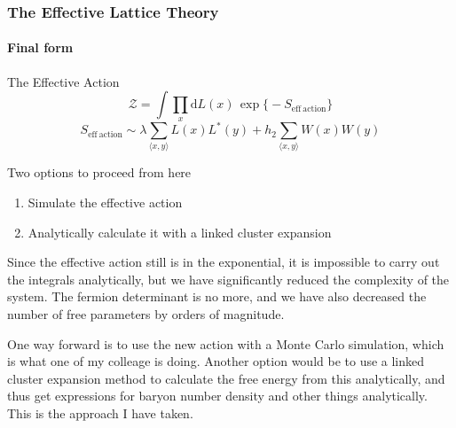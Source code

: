 \documentclass[12pt,a4paper,dvipsnames,usenames]{beamer}
\begin{document}
\begin{frame}
  \frametitle{The Effective Lattice Theory}
  \framesubtitle{Final form}

  \begin{alertblock}{The Effective Action} \vspace{5pt}
    \[
      \mathcal{Z} = \int \prod_x \mathrm{d} L(x) \, \exp \big\{ \minus S_{\mathrm{eff \: action}} \big\}
    \]
    \[
      S_{\mathrm{eff \: action}} \sim \lambda \sum_{\langle x, y \rangle} L(x) L^*(y) + h_2\sum_{\langle x, y \rangle} W(x) W(y)
    \]
  \end{alertblock}

  \vspace{1em}

  Two options to proceed from here

  \begin{enumerate}
    \item Simulate the effective action
    \item {}Analytically calculate it with a linked cluster expansion
  \end{enumerate}

  {
    Since the effective action still is in the exponential, it is impossible to carry out the integrals analytically, but we have
    significantly reduced the complexity of the system. The fermion determinant is no more, and we have also decreased the number
    of free parameters by orders of magnitude.

    One way forward is to use the new action with a Monte Carlo simulation, which is what one of my colleage is doing. Another
    option would be to use a linked cluster expansion method to calculate the free energy from this analytically, and thus get
    expressions for baryon number density and other things analytically. This is the approach I have taken.
  }

\end{frame}
\end{document}
